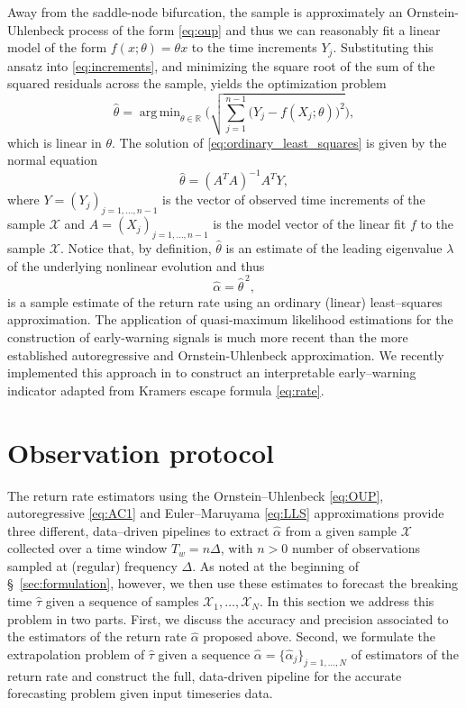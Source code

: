 \documentclass[openacc]{rsproca_new}
\DeclareMathOperator*{\argmin}{\arg\,min}
\begin{document}
Away from the saddle-node bifurcation, the sample is approximately an Ornstein-Uhlenbeck process of the form \eqref{eq:oup} and thus we can reasonably fit a linear model of the form $f(x;\theta) = \theta x$ to the time increments $Y_j$.
Substituting this ansatz into \eqref{eq:increments}, and minimizing the square root of the sum of the squared residuals across the sample, yields the optimization problem
%
\begin{equation}\label{eq:ordinary_least_squares}
        \hat\theta = \argmin_{\theta\in\mathbb{R}}\Biggl(\sqrt{\sum_{j=1}^{n-1}\bigl(Y_j-f(X_j;\theta)\bigr)^2}\Biggr) ,
\end{equation}
%
which is linear in $\theta$.
The solution of \eqref{eq:ordinary_least_squares} is given by the normal equation
%
\begin{equation}\label{eq:normal_equation}
        \hat\theta = (A^TA)^{-1}A^TY,
\end{equation}
%
where $Y=(Y_j)_{j=1,\dots,n-1}$ is the vector of observed time increments of the sample $\mathcal{X}$ and $A=(X_j)_{j=1,\dots,n-1}$ is the model vector of the linear fit $f$ to the sample $\mathcal{X}$.
Notice that, by definition, $\hat{\theta}$ is an estimate of the leading eigenvalue $\lambda$ of the underlying nonlinear evolution and thus
%
\begin{equation}\label{eq:LLS}
        \hat\alpha = \hat{\theta}^{\,2},
\end{equation}
%
is a sample estimate of the return rate using an ordinary (linear) least--squares approximation. 
The application of quasi-maximum likelihood estimations for the construction of early-warning signals is much more recent than the more established autoregressive and Ornstein-Uhlenbeck approximation. 
We recently implemented this approach in \cite{Papapicco2026} to construct an interpretable early--warning indicator adapted from Kramers escape formula \eqref{eq:rate}.

\section{Observation protocol}\label{sec:observation}
The return rate estimators using the Ornstein--Uhlenbeck \eqref{eq:OUP}, autoregressive \eqref{eq:AC1} and Euler--Maruyama \eqref{eq:LLS} approximations provide three different, data--driven pipelines to extract $\hat\alpha$ from a given sample $\mathcal{X}$ collected over a time window $T_w=n\Delta$, with $n>0$ number of observations sampled at (regular) frequency $\Delta$.
As noted at the beginning of \S~\ref{sec:formulation}, however, we then use these estimates to forecast the breaking time $\hat\tau$ given a sequence of samples $\mathcal{X}_1,\dots,\mathcal{X}_N$.
In this section we address this problem in two parts.
First, we discuss the accuracy and precision associated to the estimators of the return rate $\hat\alpha$ proposed above.
Second, we formulate the extrapolation problem of $\hat\tau$ given a sequence $\hat\alpha=\{\hat\alpha_j\}_{j=1,\dots,N}$ of estimators of the return rate and construct the full, data-driven pipeline for the accurate forecasting problem given input timeseries data.
\end{document}
